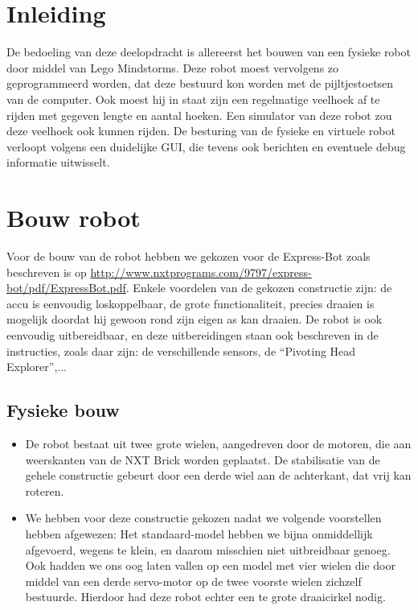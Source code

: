 \documentclass[tt1]{penoverslag}
\begin{document}

\maketitlepage

\begin{abstract}
\lipsum[1-2]
\end{abstract}

\tableofcontents

\newpage

\section{Inleiding}
De bedoeling van deze deelopdracht is allereerst het bouwen van een fysieke robot door middel van Lego Mindstorms.
Deze robot moest vervolgens zo geprogrammeerd worden, dat deze bestuurd kon worden met de pijltjestoetsen van de computer.
Ook moest hij in staat zijn een regelmatige veelhoek af te rijden met gegeven lengte en aantal hoeken.
Een simulator van deze robot zou deze veelhoek ook kunnen rijden.
De besturing van de fysieke en virtuele robot verloopt volgens een duidelijke GUI, die tevens ook berichten en eventuele debug informatie uitwisselt.


\section{Bouw robot}
Voor de bouw van de robot hebben we gekozen voor de Express-Bot zoals beschreven is op \url{http://www.nxtprograms.com/9797/express-bot/pdf/ExpressBot.pdf}. 
Enkele voordelen van de gekozen constructie zijn: de accu is eenvoudig loskoppelbaar, de grote functionaliteit, precies draaien is mogelijk doordat hij gewoon rond zijn eigen as kan draaien. De robot is ook eenvoudig uitbereidbaar, en deze uitbereidingen staan ook beschreven in de instructies, zoals daar zijn: de verschillende sensors, de ``Pivoting Head Explorer'',...

\subsection{Fysieke bouw}
\begin{itemize}
\item De robot bestaat uit twee grote wielen, aangedreven door de motoren, die aan weerskanten van de NXT Brick worden geplaatst. De stabilisatie van de gehele constructie gebeurt door een derde wiel aan de achterkant, dat vrij kan roteren.
\item We hebben voor deze constructie gekozen nadat we volgende voorstellen hebben afgewezen: Het standaard-model hebben we bijna onmiddellijk afgevoerd, wegens te klein, en daarom misschien niet uitbreidbaar genoeg. Ook hadden we ons oog laten vallen op een model met vier wielen die door middel van een derde servo-motor op de twee voorste wielen zichzelf bestuurde. Hierdoor had deze robot echter een te grote draaicirkel nodig.
\end{itemize}
\end{document}
